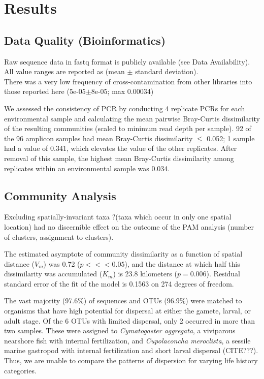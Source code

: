 \documentclass[11pt,letterpaper]{article} %
\begin{document}
\section*{Results}

\subsection*{Data Quality (Bioinformatics)}
Raw sequence data in fastq format is publicly available (see Data Availability).
All value ranges are reported as (mean $\pm$ standard deviation).\\
There was a very low frequency of cross-contamination from other libraries into those reported here (5e-05$\pm$8e-05; max 0.00034)

We assessed the consistency of PCR by conducting 4 replicate PCRs for each environmental sample and calculating the mean pairwise Bray-Curtis dissimilarity of the resulting communities (scaled to minimum read depth per sample).
92 of the 96 amplicon samples had mean Bray-Curtis dissimilarity $\leq$ 0.052; 1 sample had a value of 0.341, which elevates the value of the other replicates.
After removal of this sample, the highest mean Bray-Curtis dissimilarity among replicates within an environmental sample was 0.034.



\subsection*{Community Analysis}
Excluding spatially-invariant taxa ?(taxa which occur in only one spatial location) had no discernible effect on the outcome of the PAM analysis (number of clusters, assignment to clusters).

The estimated asymptote of community dissimilarity as a function of spatial distance ($V_m$) was 0.72 ($p <<< 0.05$), and the distance at which half this dissimilarity was accumulated ($K_m$) is 23.8 kilometers ($p = 0.006$).
Residual standard error of the fit of the model is 0.1563 on 274 degrees of freedom.

The vast majority (97.6\%) of sequences and OTUs (96.9\%) were matched to organisms that have high potential for dispersal at either the gamete, larval, or adult stage.
Of the 6 OTUs with limited dispersal, only 2 occurred in more than two samples.
These were assigned to \textit{Cymatogaster aggregata}, a viviparous nearshore fish with internal fertilization, and \textit{Cupolaconcha meroclista}, a sessile marine gastropod with internal fertilization and short larval dispersal (CITE???).
Thus, we are unable to compare the patterns of dispersion for varying life history categories.
\end{document}
